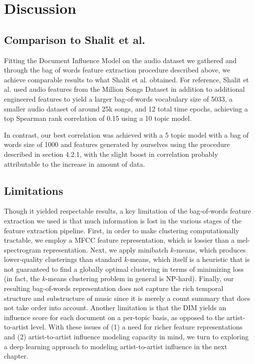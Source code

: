 
\section{Discussion}
\subsection{Comparison to Shalit et al.}
Fitting the Document Influence Model on the audio dataset we gathered and through the bag of words feature extraction procedure described above, we achieve comparable results to what Shalit et al. obtained. For reference, Shalit et al. used audio features from the Million Songs Dataset in addition to additional engineered features to yield a larger bag-of-words vocabulary size of 5033, a smaller audio dataset of around 25k songs, and 12 total time epochs, achieving a top Spearman rank correlation of 0.15 using a 10 topic model.

In contrast, our best correlation was achieved with a 5 topic model with a bag of words size of 1000 and features generated by ourselves using the procedure described in section 4.2.1, with the slight boost in correlation probably attributable to the increase in amount of data.

\subsection{Limitations}
Though it yielded respectable results, a key limitation of the bag-of-words feature extraction we used is that much information is lost in the various stages of the feature extraction pipeline. First, in order to make clustering computationally tractable, we employ a MFCC feature representation, which is lossier than a mel-spectrogram representation. Next, we apply minibatch $k$-means, which produces lower-quality clusterings than standard $k$-means, which itself is a heuristic that is not guaranteed to find a globally optimal clustering in terms of minimizing loss (in fact, the $k$-means clustering problem in general is NP-hard). Finally, our resulting bag-of-words representation does not capture the rich temporal structure and substructure of music since it is merely a count summary that does not take order into account. Another limitation is that the DIM yields an influence score for each document on a per-topic basis, as opposed to the artist-to-artist level. With these issues of (1) a need for richer feature representations and (2) artist-to-artist influence modeling capacity in mind, we turn to exploring a deep learning approach to modeling artist-to-artist influence in the next chapter.